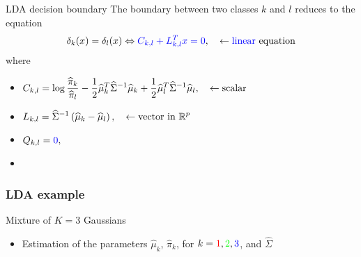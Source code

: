 \begin{frame}{LDA decision boundary}
The boundary between two classes $k$ and $l$ reduces to the equation
\begin{align*}
\delta_k(x)= \delta_l(x)  \Leftrightarrow {\textcolor{blue}{ C_{k,l} + L_{k,l}^T x  = 0 }}, \quad \leftarrow \text{{\textcolor{blue}{linear}} equation}
\end{align*}
where
\begin{itemize}
 \item $\begin{displaystyle}
        C_{k,l}= {  \log \frac{\widehat{\pi}_k}{\widehat{\pi}_l}
        - \frac{1}{2} {\widehat{\mu}_k}^T \widehat{\Sigma}^{-1} \widehat{\mu}_k + \frac{1}{2}
 {\widehat{\mu}_l}^T \widehat{\Sigma}^{-1} \widehat{\mu}_l},
       \end{displaystyle} \quad \leftarrow \text{scalar}$
 \item $\begin{displaystyle}
          L_{k,l}=  \widehat{\Sigma}^{-1} \left( \widehat{\mu}_k -  \widehat{\mu}_l \right),
        \end{displaystyle}\quad \leftarrow \text{vector in } \mathbb{R}^p$
\item $\begin{displaystyle}
          Q_{k,l}= \structuretext{0},
        \end{displaystyle}$
\end{itemize}

\begin{itemize}
 \item[\doigt] 
\end{itemize}


\end{frame}




\begin{frame}
  \frametitle{LDA example}
\begin{block}{Mixture of $K=3$ Gaussians}
\begin{itemize}
   \item Estimation of the parameters  $\hat{\mu}_k$, $\hat{\pi}_k$, for
   $k= \textcolor{red}{1},\textcolor{green}{2},\textcolor{blue}{3}$, and $\hat{\Sigma}$
\end{itemize}
\end{block}
\vspace*{-5mm}

\begin{center}
\end{center}

\end{frame}


